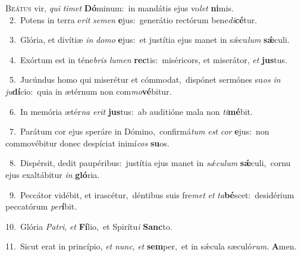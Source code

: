 \lettrine{\initial\textcolor{\initialcolor}{B}}{eátus} vir, \textit{qui} \textit{ti}\-\textit{met} \textbf{Dó}\-minum:~\star in mandátis ejus vo\textit{let} \textbf{ni}\-mis.\\
{\numbfont\textcolor{\numbcolor}{~2.}}~Potens in terra e\textit{rit} \textit{se}\-\textit{men} \textbf{e}\-jus:~\star generátio rectórum bene\-\textit{di}\-\textbf{cé}tur.\par
{\numbfont\textcolor{\numbcolor}{~3.}}~Glória, et divítiæ \textit{in} \textit{do}\-\textit{mo} \textbf{e}\-jus:~\star et justítia ejus manet in sǽcu\textit{lum} \textbf{sǽ}\-culi.\par
{\numbfont\textcolor{\numbcolor}{~4.}}~Exórtum est in téne\textit{bris} \textit{lu}\-\textit{men} \textbf{rec}\-tis:~\star miséricors, et miserátor, \textit{et} \textbf{jus}\-tus.\par
{\numbfont\textcolor{\numbcolor}{~5.}}~Jucúndus homo qui miserétur et cómmodat,~\dagger dispónet sermónes su\textit{os} \textit{in} \textit{ju}\-\textbf{dí}cio:~\star quia in ætérnum non com\-\textit{mo}\-\textbf{vé}bitur.\par
{\numbfont\textcolor{\numbcolor}{~6.}}~In memória ætér\textit{na} \textit{e}\-\textit{rit} \textbf{jus}\-tus:~\star ab auditióne mala non \textit{ti}\-\textbf{mé}bit.\par
{\numbfont\textcolor{\numbcolor}{~7.}}~Parátum cor ejus speráre in Dómino,~\dagger confirmá\textit{tum} \textit{est} \textit{cor} \textbf{e}\-jus:~\star non commovébitur donec despíciat inimí\textit{cos} \textbf{su}\-os.\par
{\numbfont\textcolor{\numbcolor}{~8.}}~Dispérsit, dedit paupéribus:~\dagger justítia ejus manet in \textit{sǽ}\-\textit{cu}\textit{lum} \textbf{sǽ}\-culi,~\star cornu ejus exaltábitur \textit{in} \textbf{gló}\-ria.\par
{\numbfont\textcolor{\numbcolor}{~9.}}~Peccátor vidébit, et irascétur,~\dagger déntibus suis fre\textit{met} \textit{et} \textit{ta}\-\textbf{bé}scet:~\star desidérium peccatórum \textit{per}\-\textbf{í}bit.\par
{\numbfont\textcolor{\numbcolor}{10.}}~Glória \textit{Pa}\-\textit{tri}, \textit{et} \textbf{Fí}\-lio,~\star et Spirítu\textit{i} \textbf{Sanc}\-to.\par
{\numbfont\textcolor{\numbcolor}{11.}}~Sicut erat in princípio, \textit{et} \textit{nunc}\-, \textit{et} \textbf{sem}\-per,~\star et in sǽcula sæculó\-\textit{rum}\-. \textbf{A}\-men.\par
